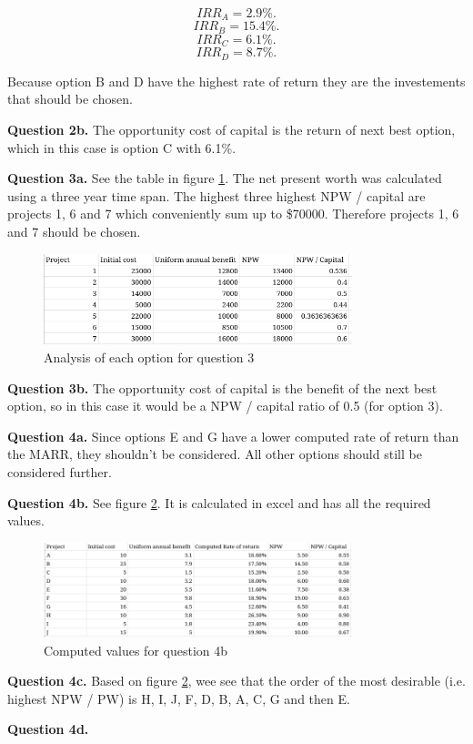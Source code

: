 \documentclass[letterpaper, reqno,11pt]{article}
\begin{document}
 \[
IRR_A = 2.9\%
.\]
 \[
IRR_B = 15.4\%
.\]
 \[
IRR_C = 6.1\%
.\]
 \[
IRR_D = 8.7\%
.\]

Because option B and D have the highest rate of return they are the investements that should be chosen. 

{\noindent\bf Question 2b.} The opportunity cost of capital is the return of next best option, which in this case is option C with 6.1\%. 

{\noindent\bf Question 3a.} See the table in figure \ref{fig:q3}. The net present worth was calculated using a three year time span. The highest three highest NPW / capital are projects 1, 6 and 7 which conveniently sum up to \$70000. Therefore projects 1, 6 and 7 should be chosen. 

\begin{figure}[htpb]
    \centering
    \includegraphics[width=0.8\textwidth]{q3}
    \caption{Analysis of each option for question 3}
    \label{fig:q3}
\end{figure}

{\noindent\bf Question 3b.} The opportunity cost of capital is the benefit of the next best option, so in this case it would be a NPW / capital ratio of 0.5 (for option 3). 

{\noindent\bf Question 4a.} Since options E and G have a lower computed rate of return than the MARR, they shouldn't be considered. All other options should still be considered further. 

{\noindent\bf Question 4b.} See figure \ref{fig:q4}. It is calculated in excel and has all the required values. 

\begin{figure}[htpb]
    \centering
    \includegraphics[width=0.8\textwidth]{q4}
    \caption{Computed values for question 4b}
    \label{fig:q4}
\end{figure}

{\noindent\bf Question 4c.} Based on figure \ref{fig:q4}, wee see that the order of the most desirable (i.e. highest NPW / PW) is H, I, J, F, D, B, A, C, G and then E. 

{\noindent\bf Question 4d.} 
\end{document}
